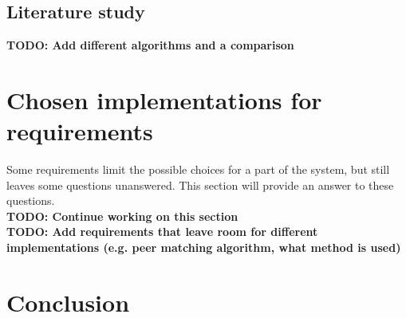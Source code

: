 \documentclass[]{article}
\newcommand{\TODO}[1]{{\color{red}\textbf{TODO: #1}}}
\begin{document}
\subsection{Literature study}
\cite{cmu}
\TODO{Add different algorithms and a comparison}

\section{Chosen implementations for requirements}
Some requirements limit the possible choices for a part of the system, but still leaves some questions unanswered.
This section will provide an answer to these questions.\\
\TODO{Continue working on this section}\\
\TODO{Add requirements that leave room for different implementations (e.g. peer matching algorithm, what method is used)}

\section{Conclusion}

\newpage


\end{document}
